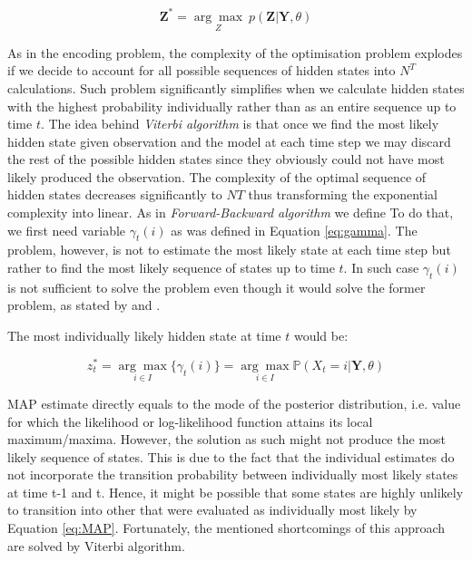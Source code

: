 \begin{equation} \label{eq:MAP}
    \textbf{Z}^* = \underset{Z}{\arg\max} \: p(\textbf{Z}|\textbf{Y},\theta)
\end{equation}

As in the encoding problem, the complexity of the optimisation problem explodes if we decide to account for all possible sequences of hidden states into $N^T$ calculations. 
Such problem significantly simplifies when we calculate hidden states with the highest probability individually rather than as an entire sequence up to time $t$. 
The idea behind \textit{Viterbi algorithm} is that once we find the most likely hidden state given observation and the model at each time step 
we may discard the rest of the possible hidden states since they obviously could not have most likely produced the observation. The complexity of the optimal 
sequence of hidden states decreases significantly to $NT$ thus transforming the exponential complexity into linear. As in \textit{Forward-Backward algorithm} we define 
To do that, we first need variable $\gamma_t(i)$ as was defined in Equation \ref{eq:gamma}. The problem, however, is not to estimate the most likely state at each time step
but rather to find the most likely sequence of states up to time $t$. In such case $\gamma_t(i)$ is not sufficient to solve the problem even though it would solve the former problem, as stated by \citep{Rabiner1989} and \citep{Oliver2013}.

The most individually likely hidden state at time $t$ would be:

\begin{equation}
    z_t^* = \underset{i \in I}{\arg\max} \{\gamma_t(i)\} = \underset{i \in I}{\arg\max} \mathbb{P}(X_t=i|\textbf{Y},\theta)
\end{equation}

MAP estimate directly equals to the mode of the posterior distribution, i.e. value for which the likelihood or log-likelihood function attains its local maximum/maxima. 
However, the solution as such might not produce the most likely sequence of states. This is due to the fact that the individual estimates do not incorporate 
the transition probability between individually most likely states at time t-1 and t. Hence, it might be possible that some states are highly unlikely to transition 
into other that were evaluated as individually most likely by Equation \ref{eq:MAP}. Fortunately, the mentioned shortcomings of this approach are solved by Viterbi algorithm.

